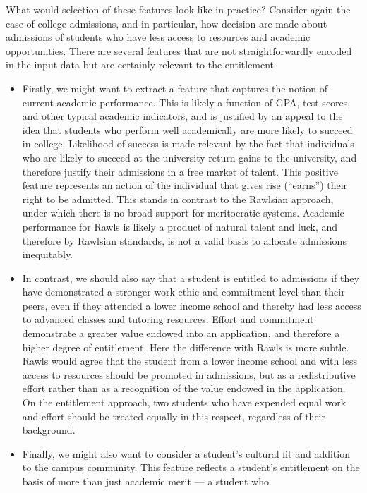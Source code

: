 What would selection of these features look like in practice? Consider again the case of
college admissions, and in particular, how decision are made about admissions of
students who have less access to resources and academic opportunities. There are
several features that are not straightforwardly encoded in the input data but
are certainly relevant to the entitlement
\begin{itemize}
    \item Firstly, we might want to extract a feature that captures the notion
    of current academic performance. This is likely a function of GPA, test
    scores, and other typical academic indicators, and is justified by an appeal
    to the idea that students who perform well academically are more likely to
    succeed in college. Likelihood of success is made relevant by the fact
    that individuals who are likely to succeed at the university return gains 
    to the university, and therefore justify their admissions in a free market
    of talent. This positive feature represents an action of the individual that
    gives rise (``earns'') their right to be admitted. This stands in contrast
    to the Rawlsian approach, under which there is no broad support for
    meritocratic systems. Academic performance for Rawls is likely a product of
    natural talent and luck, and therefore by Rawlsian standards, is not a valid
    basis to allocate admissions inequitably.
    \item In contrast, we should also say that a student is entitled to admissions if
    they have demonstrated a stronger work ethic and commitment level than their
    peers, even if they attended a lower income school and thereby had less 
    access to advanced classes and tutoring resources. Effort and commitment
    demonstrate a greater value endowed into an application, and therefore a
    higher degree of entitlement. Here the difference with Rawls is more subtle.
    Rawls would agree that the student from a lower income school and with less
    access to resources should be promoted in admissions, but as a redistributive
    effort rather than as a recognition of the value endowed in the application.
    On the entitlement approach, two students who have expended equal work and
    effort should be treated equally in this respect, regardless of their 
    background.
    \item Finally, we might also want to consider a student's cultural fit and
    addition to the campus community. This feature reflects a student's
    entitlement on the basis of more than just academic merit — a student who

\end{itemize}

